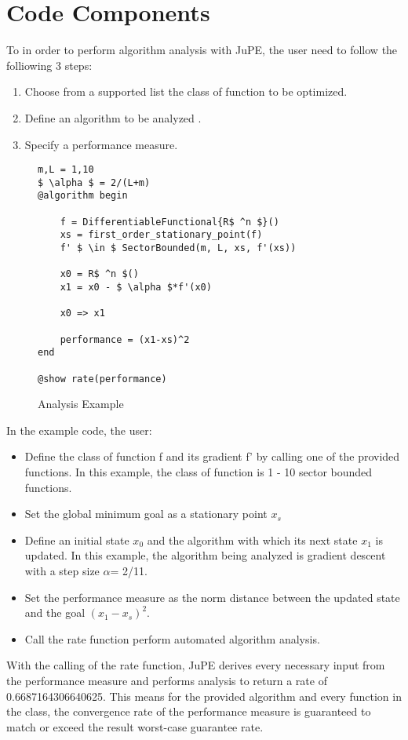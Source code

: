 \chapter{Code Components}

To in order to perform algorithm analysis with JuPE, the user need to follow the folliowing 3 steps:
\begin{enumerate}
	\item Choose from a supported list the class of function to be optimized.
	\item Define an algorithm to be analyzed .
	\item Specify a performance measure.
  \end{enumerate}
 
\begin{figure}[hbtp]
	\begin{lstlisting}[mathescape]
m,L = 1,10
$ \alpha $ = 2/(L+m)
@algorithm begin

	f = DifferentiableFunctional{R$ ^n $}()
	xs = first_order_stationary_point(f)
	f' $ \in $ SectorBounded(m, L, xs, f'(xs))

	x0 = R$ ^n $()
	x1 = x0 - $ \alpha $*f'(x0)

	x0 => x1

	performance = (x1-xs)^2
end

@show rate(performance)
\end{lstlisting}
\caption{Analysis Example}
\label{ex_analysis}
\end{figure}

In the example code, the user:
\begin{itemize}
	\item Define the class of function f and its gradient f' by calling one of the provided functions. In this example, the class of function is 1 - 10 sector bounded functions.
	\item Set the global minimum goal as a stationary point $ x_s $
	\item Define an initial state $ x_0 $ and the algorithm with which its next state $ x_1$ is updated. In this example, the algorithm being analyzed is gradient descent with a step size $ \alpha $= 2/11.
	\item Set the performance measure as the norm distance between the updated state and the goal $ (x_1 - x_s)^2 $.
	\item Call the rate function perform automated algorithm analysis.
\end{itemize}

With the calling of the rate function, JuPE derives every necessary input from the performance measure and performs analysis to return a rate of 0.6687164306640625. This means for the provided algorithm and every function in the class, the convergence rate of the performance measure is guaranteed to match or exceed the result worst-case guarantee rate.
 
